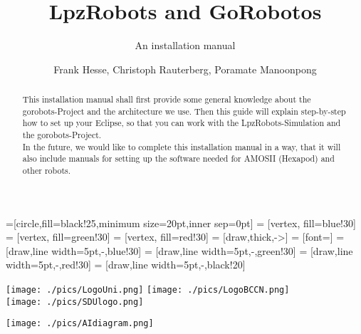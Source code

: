\documentclass[a4paper,10pt]{scrartcl}
\title{LpzRobots and GoRobotos}
\subtitle{An installation manual}
\author{Frank Hesse, Christoph Rauterberg, Poramate Manoonpong}
\begin{document}
 =[circle,fill=black!25,minimum size=20pt,inner sep=0pt]
  = [vertex, fill=blue!30]
  = [vertex, fill=green!30]
  = [vertex, fill=red!30]
  = [draw,thick,->]
  = [font=\small]
  = [draw,line width=5pt,-,blue!30]
  = [draw,line width=5pt,-,green!30]
  = [draw,line width=5pt,-,red!30]
  = [draw,line width=5pt,-,black!20]
\renewcommand{\emph}[1]{\textcolor{blue}{#1}}
\newcommand{\remph}[1]{\textcolor{red}{#1}}


\maketitle

\begin{center}
\texttt{[image: ./pics/LogoUni.png]} %
 \texttt{[image: ./pics/LogoBCCN.png]}\\ %
 \texttt{[image: ./pics/SDUlogo.png]} %
\end{center}

\begin{abstract}
This installation manual shall first provide some general knowledge about the gorobots-Project and
the architecture we use. Then this guide will explain step-by-step how to set up
your Eclipse, so that you can work with the LpzRobots-Simulation and the gorobots-Project. \\
In the future, we would like to complete this installation manual in a way, that it will also include manuals for setting up the software needed for AMOSII (Hexapod) and other robots.
\end{abstract}

\begin{center}
\texttt{[image: ./pics/AIdiagram.png]}
\end{center}


\thispagestyle{empty}
\newpage
\thispagestyle{empty}
\tableofcontents


\newpage
\pagestyle{fancy} %
\fancyhf{} %
\renewcommand{\headrulewidth}{0pt}










\end{document}
